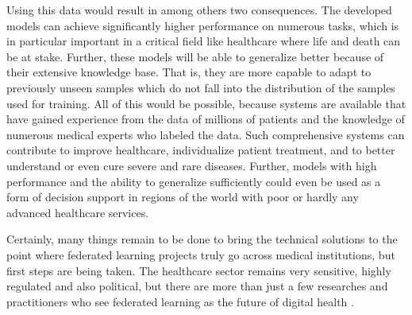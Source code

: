 Using this data would result in among others two consequences.
The developed models can achieve significantly higher performance on numerous tasks, which is in particular important in a critical field like healthcare where life and death can be at stake.
Further, these models will be able to generalize better because of their extensive knowledge base. That is, they are more capable to adapt to previously unseen samples which do not fall into the distribution of the samples used for training. 
All of this would be possible, because systems are available that have gained experience from the data of millions of patients and the knowledge of numerous medical experts who labeled the data.
Such comprehensive systems can contribute to improve healthcare, individualize patient treatment, and to better understand or even cure severe and rare diseases.
Further, models with high performance and the ability to generalize sufficiently could even be used as a form of decision support in regions of the world with poor or hardly any advanced healthcare services.

Certainly, many things remain to be done to bring the technical solutions to the point where federated learning projects truly go across medical institutions, but first steps are being taken. The healthcare sector remains very sensitive, highly regulated and also political, but there are more than just a few researches and practitioners who see federated learning as the future of digital health \citep{Rieke2020TheLearning}.



